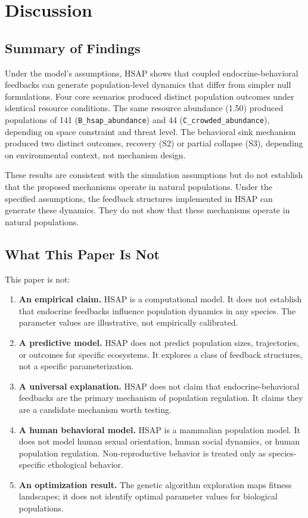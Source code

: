 \section{Discussion}
\label{sec:discussion}

\subsection{Summary of Findings}

Under the model's assumptions, HSAP shows that coupled endocrine-behavioral feedbacks can generate population-level dynamics that differ from simpler null formulations. Four core scenarios produced distinct population outcomes under identical resource conditions. The same resource abundance (1.50) produced populations of 141 (\texttt{B\_hsap\_abundance}) and 44 (\texttt{C\_crowded\_abundance}), depending on space constraint and threat level. The behavioral sink mechanism produced two distinct outcomes, recovery (S2) or partial collapse (S3), depending on environmental context, not mechanism design.

These results are consistent with the simulation assumptions but do not establish that the proposed mechanisms operate in natural populations. Under the specified assumptions, the feedback structures implemented in HSAP can generate these dynamics. They do not show that these mechanisms operate in natural populations.

\subsection{What This Paper Is Not}

This paper is not:

\begin{enumerate}
\item \textbf{An empirical claim.} HSAP is a computational model. It does not establish that endocrine feedbacks influence population dynamics in any species. The parameter values are illustrative, not empirically calibrated.

\item \textbf{A predictive model.} HSAP does not predict population sizes, trajectories, or outcomes for specific ecosystems. It explores a class of feedback structures, not a specific parameterization.

\item \textbf{A universal explanation.} HSAP does not claim that endocrine-behavioral feedbacks are the primary mechanism of population regulation. It claims they are a candidate mechanism worth testing.

\item \textbf{A human behavioral model.} HSAP is a mammalian population model. It does not model human sexual orientation, human social dynamics, or human population regulation. Non-reproductive behavior is treated only as species-specific ethological behavior.

\item \textbf{An optimization result.} The genetic algorithm exploration maps fitness landscapes; it does not identify optimal parameter values for biological populations.
\end{enumerate}

